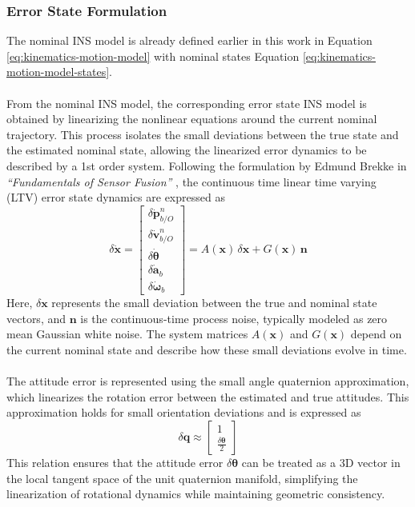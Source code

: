 \subsubsection{Error State Formulation}
The nominal INS model is already defined earlier in this work in Equation \ref{eq:kinematics-motion-model} with nominal states Equation \ref{eq:kinematics-motion-model-states}.
\\ \\
From the nominal INS model, the corresponding error state INS model is obtained by linearizing the nonlinear equations around the current nominal trajectory. This process isolates the small deviations between the true state and the estimated nominal state, allowing the linearized error dynamics to be described by a 1st order system. Following the formulation by Edmund Brekke in \textit{``Fundamentals of Sensor Fusion''} \cite{sensor_fusion_book}, the continuous time linear time varying (LTV) error state dynamics are expressed as
$$
    \delta\dot{\mathbf{x}} =
    \begin{bmatrix}
        \delta\dot{\mathbf{p}}_{b/O}^{n} \\
        \delta\dot{\mathbf{v}}_{b/O}^{n} \\
        \delta\dot{\mathbf{\theta}} \\
        \delta\dot{\mathbf{a}}_b \\
        \delta\dot{\mathbf{\omega}}_b
    \end{bmatrix}
    =
    A(\mathbf{x}) \, \delta\mathbf{x} + G(\mathbf{x})\,\mathbf{n}
$$
Here, $\delta\mathbf{x}$ represents the small deviation between the true and nominal state vectors, and $\mathbf{n}$ is the continuous-time process noise, typically modeled as zero mean Gaussian white noise. The system matrices $A(\mathbf{x})$ and $G(\mathbf{x})$ depend on the current nominal state and describe how these small deviations evolve in time.  
\\ \\
The attitude error is represented using the small angle quaternion approximation, which linearizes the rotation error between the estimated and true attitudes. This approximation holds for small orientation deviations and is expressed as
$$
    \delta\mathbf{q} \approx
    \begin{bmatrix}
        1 \\
        \tfrac{\delta\boldsymbol{\theta}}{2}
    \end{bmatrix}
$$
This relation ensures that the attitude error $\delta\boldsymbol{\theta}$ can be treated as a 3D vector in the local tangent space of the unit quaternion manifold, simplifying the linearization of rotational dynamics while maintaining geometric consistency.  



